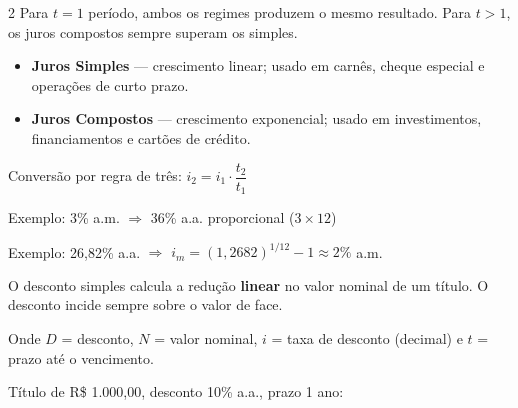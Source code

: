 \documentclass[12pt]{article}
\begin{document}
\begin{multicols}{2}
Para $t = 1$ período, ambos os regimes produzem o mesmo resultado.
Para $t > 1$, os juros compostos sempre superam os simples.

\begin{itemize}
  \item \textbf{Juros Simples} — crescimento linear; usado em carnês, cheque especial e operações de curto prazo.
  \item \textbf{Juros Compostos} — crescimento exponencial; usado em investimentos, financiamentos e cartões de crédito.
\end{itemize}




Conversão por regra de três: $i_2 = i_1 \cdot \dfrac{t_2}{t_1}$

Exemplo: 3\% a.m. $\Rightarrow$ 36\% a.a. proporcional ($3 \times 12$)



Exemplo: 26{,}82\% a.a. $\Rightarrow$ $i_m = (1{,}2682)^{1/12} - 1 \approx 2\%$ a.m.



O desconto simples calcula a redução \textbf{linear} no valor nominal de um título.
O desconto incide sempre sobre o valor de face.


Onde $D$ = desconto, $N$ = valor nominal, $i$ = taxa de desconto (decimal)
e $t$ = prazo até o vencimento.




Título de R\$ 1.000,00, desconto 10\% a.a., prazo 1 ano:


\end{multicols}
\end{document}
